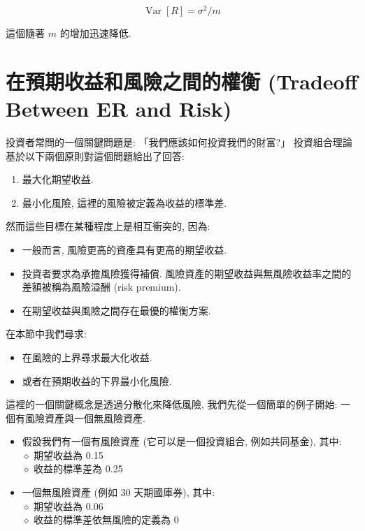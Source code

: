 \documentclass[letterpaper]{article}
\begin{document}
		$$
		\operatorname{Var}[R]=\sigma^{2} / m
		$$
		
		這個隨著 $m$ 的增加迅速降低.
		
		\section{在預期收益和風險之間的權衡 (Tradeoff Between ER and Risk)}
		投資者常問的一個關鍵問題是: 「我們應該如何投資我們的財富?」  投資組合理論基於以下兩個原則對這個問題給出了回答: 
		
		\begin{enumerate}
			\item 最大化期望收益.
			\item 最小化風險, 這裡的風險被定義為收益的標準差. 
		\end{enumerate}
		
		然而這些目標在某種程度上是相互衝突的, 因為: 
		
		\begin{itemize}
			\item 一般而言, 風險更高的資產具有更高的期望收益.
			\item 投資者要求為承擔風險獲得補償. 風險資產的期望收益與無風險收益率之間的差額被稱為風險溢酬 (risk premium). 
			\item 在期望收益與風險之間存在最優的權衡方案.
		\end{itemize}
		
		在本節中我們尋求: 
		
		\begin{itemize}
			\item 在風險的上界尋求最大化收益. 
			\item 或者在預期收益的下界最小化風險. 
		\end{itemize}
		
		
		這裡的一個關鍵概念是透過分散化來降低風險, 我們先從一個簡單的例子開始: 一個有風險資產與一個無風險資產. 
		
		\begin{itemize}
			\item 假設我們有一個有風險資產 (它可以是一個投資組合, 例如共同基金), 其中: \\
			$\diamond$ 期望收益為 0.15\\
			$\diamond$ 收益的標準差為 0.25
			\item 一個無風險資產 (例如 30 天期國庫券), 其中: \\
			$\diamond$ 期望收益為 0.06\\
			$\diamond$ 收益的標準差依無風險的定義為 0
		\end{itemize}
		
\end{document}
